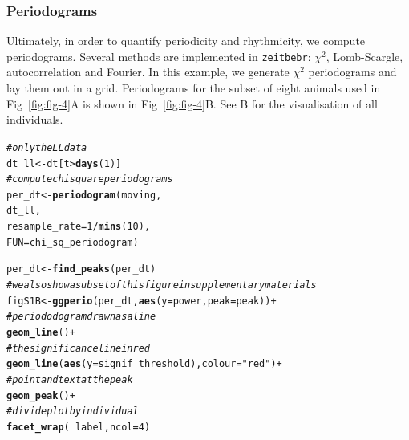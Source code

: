 \documentclass[10pt,letterpaper]{article}\usepackage[]{graphicx}\usepackage[]{color}
\makeatletter
\newcommand{\hlnum}[1]{\textcolor[rgb]{0.686,0.059,0.569}{#1}}%
\newcommand{\hlstr}[1]{\textcolor[rgb]{0.192,0.494,0.8}{#1}}%
\newcommand{\hlcom}[1]{\textcolor[rgb]{0.678,0.584,0.686}{\textit{#1}}}%
\newcommand{\hlopt}[1]{\textcolor[rgb]{0,0,0}{#1}}%
\newcommand{\hlstd}[1]{\textcolor[rgb]{0.345,0.345,0.345}{#1}}%
\newcommand{\hlkwb}[1]{\textcolor[rgb]{0.69,0.353,0.396}{#1}}%
\newcommand{\hlkwc}[1]{\textcolor[rgb]{0.333,0.667,0.333}{#1}}%
\newcommand{\hlkwd}[1]{\textcolor[rgb]{0.737,0.353,0.396}{\textbf{#1}}}%
\newenvironment{kframe}{%
 \def\at@end@of@kframe{}%
 \ifinner\ifhmode%
  \def\at@end@of@kframe{\end{minipage}}%
  \begin{minipage}{\columnwidth}%
 \fi\fi%
 \def\FrameCommand##1{\hskip\@totalleftmargin \hskip-\fboxsep
 \colorbox{shadecolor}{##1}\hskip-\fboxsep
     \hskip-\linewidth \hskip-\@totalleftmargin \hskip\columnwidth}%
 \MakeFramed {\advance\hsize-\width
   \@totalleftmargin\z@ \linewidth\hsize
   \@setminipage}}%
 {\par\unskip\endMakeFramed%
 \at@end@of@kframe}
\newenvironment{knitrout}{}{} %
\makeatother
\begin{document}
\subsubsection*{Periodograms}
Ultimately, in order to quantify periodicity and rhythmicity, we compute periodograms.
Several methods are implemented in \texttt{zeitbebr}: $\chi{}^2$, Lomb-Scargle, autocorrelation 
and Fourier.
In this example, we generate $\chi{}^2$ periodograms and lay them out in a grid.
Periodograms for the subset of eight animals used in Fig~\ref{fig:fig-4}A is shown in Fig~\ref{fig:fig-4}B. 
See B for the visualisation of all individuals.

\begin{knitrout}
\color{fgcolor}\begin{kframe}
\begin{alltt}
\hlcom{# only the LL data}
\hlstd{dt_ll} \hlkwb{<-} \hlstd{dt[t} \hlopt{>} \hlkwd{days}\hlstd{(}\hlnum{1}\hlstd{)]}
\hlcom{# compute chi square periodograms }
\hlstd{per_dt} \hlkwb{<-} \hlkwd{periodogram}\hlstd{(moving,}
                        \hlstd{dt_ll,}
                        \hlkwc{resample_rate} \hlstd{=} \hlnum{1} \hlopt{/} \hlkwd{mins}\hlstd{(}\hlnum{10}\hlstd{),}
                        \hlkwc{FUN}\hlstd{=chi_sq_periodogram)}

\hlstd{per_dt} \hlkwb{<-} \hlkwd{find_peaks}\hlstd{(per_dt)}
\hlcom{# we also show a subset of this figure in supplementary materials}
\hlstd{figS1B} \hlkwb{<-} \hlkwd{ggperio}\hlstd{(per_dt,} \hlkwd{aes}\hlstd{(}\hlkwc{y} \hlstd{= power,} \hlkwc{peak} \hlstd{= peak))} \hlopt{+}
                  \hlcom{# periododogram drawn as a line}
                  \hlkwd{geom_line}\hlstd{()} \hlopt{+}
                  \hlcom{# the significance line in red}
                  \hlkwd{geom_line}\hlstd{(}\hlkwd{aes}\hlstd{(}\hlkwc{y} \hlstd{= signif_threshold),} \hlkwc{colour} \hlstd{=} \hlstr{"red"}\hlstd{)} \hlopt{+}
                  \hlcom{# point and text at the peak}
                  \hlkwd{geom_peak}\hlstd{()} \hlopt{+}
                  \hlcom{# divide plot by individual}
                  \hlkwd{facet_wrap}\hlstd{(} \hlopt{~} \hlstd{label,} \hlkwc{ncol} \hlstd{=} \hlnum{4}\hlstd{)}
\end{alltt}
\end{kframe}
\end{knitrout}
\end{document}
